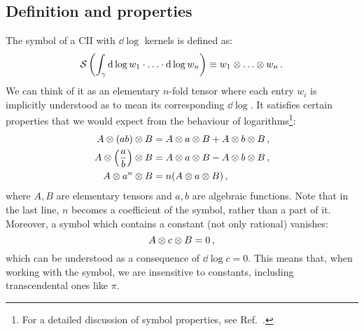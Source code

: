 \documentclass[main.tex]{subfiles}
\begin{document}
\subsection{Definition and properties}
The symbol of a CII with $\dd \log$ kernels is defined as:
\begin{equation} \label{eq:symboldef}
    \mathcal{S} \left(\int_\gamma \mathrm{d} \log w_1 \cdot \ldots \cdot \mathrm{d} \log w_n \right) \equiv w_1 \otimes \ldots \otimes w_n \,.
\end{equation}
We can think of it as an elementary $n$-fold tensor where each entry $w_i$ is implicitly understood as to mean its corresponding $\dd \log$. It satisfies certain properties that we would expect from the behaviour of logarithms\footnote{For a detailed discussion of symbol properties, see Ref.~\cite{Duhr:2011zq}.}:
\begin{subequations}
\begin{align} \label{eq:symbolproperties}
    A \otimes (ab) \otimes B &= A \otimes a \otimes B + A \otimes b \otimes B\,, \\
    A \otimes \left(\frac{a}{b}\right) \otimes B &= A \otimes a \otimes B - A \otimes b \otimes B\,, \\
    A \otimes a^n \otimes B &= n(A \otimes a \otimes B)\,,
\end{align}
\end{subequations}
where $A, B$ are elementary tensors and $a, b$ are algebraic functions. Note that in the last line, $n$ becomes a coefficient of the symbol, rather than a part of it. Moreover, a symbol which contains a constant (not only rational) vanishes:
\begin{equation} \label{eq:symbolAcB}
    A \otimes c \otimes B = 0\,,
\end{equation}
which can be understood as a consequence of $\dd \log c = 0$. This means that, when working with the symbol, we are insensitive to constants, including transcendental ones like $\pi$. 
\end{document}
